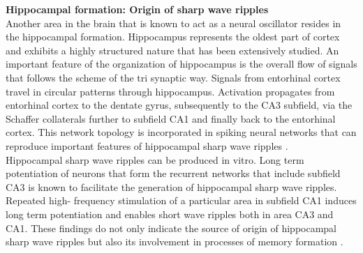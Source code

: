 \textbf{Hippocampal formation: Origin of sharp wave ripples}\\
Another area in the brain that is known to act as a neural oscillator resides in the hippocampal formation. Hippocampus represents the oldest part of cortex and exhibits a highly structured nature that has been extensively studied. An important feature of the organization of hippocampus is the overall flow of signals that follows the scheme of the tri synaptic way. Signals from entorhinal cortex travel in circular patterns through hippocampus. Activation propagates from entorhinal cortex to the dentate gyrus, subsequently to the CA3 subfield, via the Schaffer collaterals further to subfield CA1 and finally back to the entorhinal cortex. This network topology is incorporated in spiking neural networks that can reproduce important features of hippocampal sharp wave ripples \parencite{aussel2018detailed}.\\
Hippocampal sharp wave ripples can be produced in vitro. Long term potentiation of neurons that form the recurrent networks that include subfield CA3 is known to facilitate the generation of hippocampal sharp wave ripples. Repeated high- frequency stimulation of a particular area in subfield CA1 induces long term potentiation and enables short wave ripples both in area CA3 and CA1. These findings do not only indicate the source of origin of hippocampal sharp wave ripples but also its involvement in processes of memory formation \parencite{behrens2005induction}.\\

